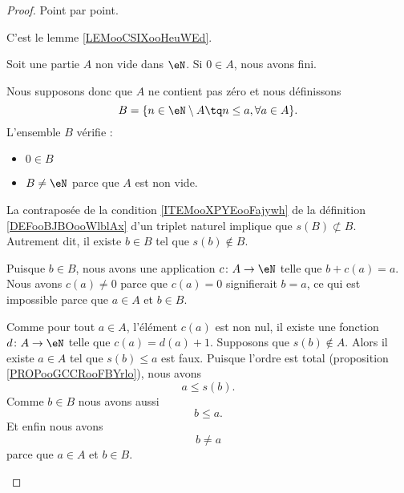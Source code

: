 \begin{proof}
	Point par point.
	\begin{subproof}
		C'est le lemme \ref{LEMooCSIXooHeuWEd}.

		Soit une partie \( A\) non vide dans \( \eN\). Si \( 0\in A\), nous avons fini.
		\begin{subproof}
			\spitem[L'ensemble \( B\)]
			Nous supposons donc que \( A\) ne contient pas zéro et nous définissons
			\begin{equation}
				B=\{ n\in \eN\setminus A\tq n\leq a, \forall a\in A \}.
			\end{equation}
			L'ensemble \( B\) vérifie :
			\begin{itemize}
				\item \( 0\in B\)
				\item \( B\neq \eN\) parce que \( A\) est non vide.
			\end{itemize}
			La contraposée de la condition \ref{ITEMooXPYEooFajywh} de la définition \ref{DEFooBJBOooWlblAx} d'un triplet naturel implique que \( s(B)\nsubset B\). Autrement dit, il existe \( b\in B\) tel que \( s(b)\notin B\).

			Puisque \( b\in B\), nous avons une application \( c\colon A\to \eN\) telle que \( b+c(a)=a\). Nous avons \( c(a)\neq 0\) parce que \( c(a)=0\) signifierait \( b=a\), ce qui est impossible parce que \( a\in A\) et \( b\in B\).

			Comme pour tout \( a\in A\), l'élément \( c(a)\) est non nul, il existe une fonction \( d\colon A\to \eN\) telle que \( c(a)=d(a)+1\).
			\spitem[\( s(b)\in A\)]
			Supposons que \( s(b)\notin A\). Alors il existe \( a\in A\) tel que \( s(b)\leq a\) est faux. Puisque l'ordre est total (proposition \ref{PROPooGCCRooFBYrlo}), nous avons
			\begin{equation}        \label{EQooYQSFooPSPJMt}
				a\leq s(b).
			\end{equation}
			Comme \( b\in B\) nous avons aussi
			\begin{equation}        \label{EQooIPAWooDBSJEa}
				b\leq a.
			\end{equation}
			Et enfin nous avons
			\begin{equation}        \label{EQooWFHRooGDSBFD}
				b\neq a
			\end{equation}
			parce que \( a\in A\) et \( b\in B\).


\end{subproof}
\end{subproof}
\end{proof}
